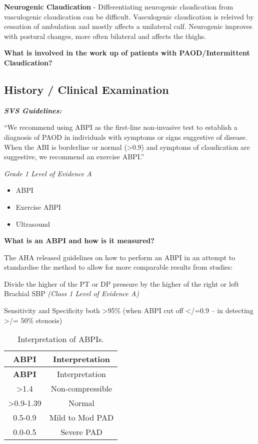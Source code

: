\documentclass[
]{book}
\begin{document}
\textbf{Neurogenic Claudication} - Differentiating neurogenic claudication
from vasculogenic claudication can be difficult. Vasculogenic claudication
is releived by cessation of ambulation and mostly affects a unilateral
calf. Neurogenic improves with postural changes, more often bilateral and
affects the thighs.
\citep{nadeauReliabilityDifferentiatingNeurogenic2013}

\textbf{What is involved in the work up of patients with PAOD/Intermittent
Claudication?}

\hypertarget{history-clinical-examination}{%
\subsection{History / Clinical Examination}\label{history-clinical-examination}}

\textbf{\emph{SVS Guidelines:}}

``We recommend using ABPI as the first-line non-invasive test to establish
a diagnosis of PAOD in individuals with symptoms or signs suggestive of
disease. When the ABI is borderline or normal (\textgreater0.9) and symptoms of
claudication are suggestive, we recommend an exercise ABPI.''

\emph{Grade 1 Level of Evidence A}

\begin{itemize}
\item
  ABPI
\item
  Exercise ABPI
\item
  Ultrasound
\end{itemize}

\textbf{What is an ABPI and how is it measured?}

The AHA released guidelines on how to perform an ABPI in an attempt
to standardise the method to allow for more comparable results from
studies:

Divide the higher of the PT or DP pressure by the higher of the right or
left Brachial SBP
\emph{(Class 1 Level of Evidence A)}
\citep{aboyansMeasurementInterpretationAnkleBrachial2012}

Sensitivity and Specificity both \textgreater95\% (when ABPI cut off \textless/=0.9 -- in
detecting \textgreater/= 50\% stenosis) \citep{yaoAnkleSystolicPressure2005, ourielCriticalEvaluationStress1982}

\begin{longtable}[]{@{}cc@{}}
\caption{Interpretation of ABPIs.}\tabularnewline
\toprule()
\textbf{ABPI} & Interpretation \\
\midrule()
\endfirsthead
\toprule()
\textbf{ABPI} & Interpretation \\
\midrule()
\endhead
\textgreater1.4 & Non-compressible \\
\textgreater0.9-1.39 & Normal \\
0.5-0.9 & Mild to Mod PAD \\
0.0-0.5 & Severe PAD \\
\bottomrule()
\end{longtable}
\end{document}
